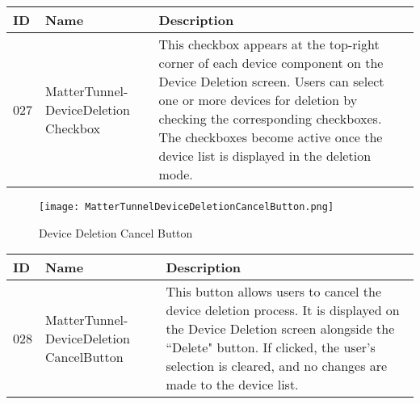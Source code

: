 \documentclass[conference]{IEEEtran}
\begin{document}
\begin{enumerate}[itemsep=2ex, parsep=1ex]
\begin{enumerate}[itemsep=2ex, parsep=1ex]
	      	      \begin{table}[h!]
	      	      	\def\arraystretch{1.24} \small
	      	      	\begin{tabular}{|p{1.2cm}|p{2.5cm}|p{4.0cm}|}
	      	      		\hline
	      	      		ID  & Name                                & Description                                                                                                                                                                                                                                                                            \\
	      	      		\hline
	      	      		027 & MatterTunnel-DeviceDeletion Checkbox & This checkbox appears at the top-right corner of each device component on the Device Deletion screen. Users can select one or more devices for deletion by checking the corresponding checkboxes. The checkboxes become active once the device list is displayed in the deletion mode. \\
	      	      		\hline
	      	      	\end{tabular}
	      	      \end{table}

                  \vspace{5cm}
	      	      
	      	      \begin{figure}[h!]
	      	      	\centering
	      	      	\texttt{[image: MatterTunnelDeviceDeletionCancelButton.png]}
	      	      	\caption{Device Deletion Cancel Button}
	      	      	\label{fig:DeviceDeletionCancelButton}
	      	      \end{figure}
	      	      	      	      
	      	      \begin{table}[h!]
	      	      	\def\arraystretch{1.24} \small
	      	      	\begin{tabular}{|p{1.2cm}|p{2.5cm}|p{4.0cm}|}
	      	      		\hline
	      	      		ID  & Name                                     & Description                                                                                                                                                                                                                            \\
	      	      		\hline
	      	      		028 & MatterTunnel-DeviceDeletion CancelButton & This button allows users to cancel the device deletion process. It is displayed on the Device Deletion screen alongside the ``Delete" button. If clicked, the user's selection is cleared, and no changes are made to the device list. \\
	      	      		\hline
	      	      	\end{tabular}
	      	      \end{table}
	      	      

\end{enumerate}
\end{enumerate}
\end{document}
